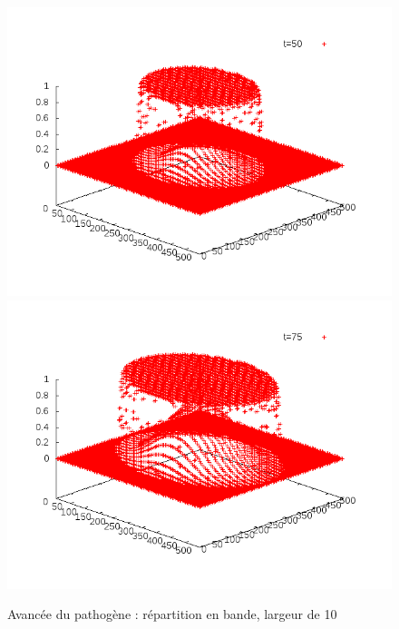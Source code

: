 \documentclass{article}
\begin{document}
\begin{figure}[!h]
	\includegraphics[scale=0.25]{img/anim1-10-100.png}
	\includegraphics[scale=0.25]{img/anim1-10-150.png}
\caption{Avancée du pathogène : répartition en bande, largeur de 10}
\label{fig1}
\end{figure}
\end{document}
